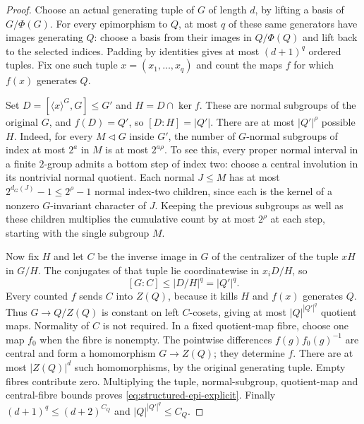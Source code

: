 \begin{proof}
Choose an actual generating tuple of $G$ of length $d$, by lifting a
basis of $G/\Phi(G)$. For every epimorphism to $Q$, at most $q$ of
these same generators have images generating $Q$: choose a basis
from their images in $Q/\Phi(Q)$ and lift back to the selected
indices. Padding by identities gives at most $(d+1)^q$ ordered
tuples. Fix one such tuple $x=(x_1,\ldots,x_q)$ and count the maps
$f$ for which $f(x)$ generates $Q$.

Set $D=[\langle x\rangle^G,G]\leq G'$ and
$H=D\cap\ker f$. These are normal subgroups of the original $G$,
and $f(D)=Q'$, so $[D:H]=|Q'|$. There are at most $|Q'|^{\rho}$
possible $H$. Indeed, for every $M\lhd G$ inside $G'$, the number
of $G$-normal subgroups of index at most $2^a$ in $M$ is at most
$2^{a\rho}$. To see this, every proper normal interval in a finite
$2$-group admits a bottom step of index two: choose a central
involution in its nontrivial normal quotient. Each normal $J\leq M$
has at most $2^{d_G(J)}-1\leq2^{\rho}-1$ normal index-two children,
since each is the kernel of a nonzero $G$-invariant character of $J$.
Keeping the previous subgroups as well as these children multiplies
the cumulative count by at most $2^{\rho}$ at each step, starting
with the single subgroup $M$.

Now fix $H$ and let $C$ be the inverse image in $G$ of the
centralizer of the tuple $xH$ in $G/H$. The conjugates of that tuple
lie coordinatewise in $x_iD/H$, so
\[
 [G:C]\leq|D/H|^q=|Q'|^q.
\]
Every counted $f$ sends $C$ into $Z(Q)$, because it kills $H$ and
$f(x)$ generates $Q$. Thus $G\to Q/Z(Q)$ is constant on left
$C$-cosets, giving at most $|Q|^{|Q'|^q}$ quotient maps. Normality
of $C$ is not required. In a fixed quotient-map fibre, choose one
map $f_0$ when the fibre is nonempty. The pointwise differences
$f(g)f_0(g)^{-1}$ are central and form a homomorphism $G\to Z(Q)$;
they determine $f$. There are at most $|Z(Q)|^d$ such
homomorphisms, by the original generating tuple. Empty fibres
contribute zero. Multiplying the tuple, normal-subgroup,
quotient-map and central-fibre bounds proves
\eqref{eq:structured-epi-explicit}. Finally
$(d+1)^q\leq(d+2)^{C_Q}$ and $|Q|^{|Q'|^q}\leq C_Q$.
\end{proof}

